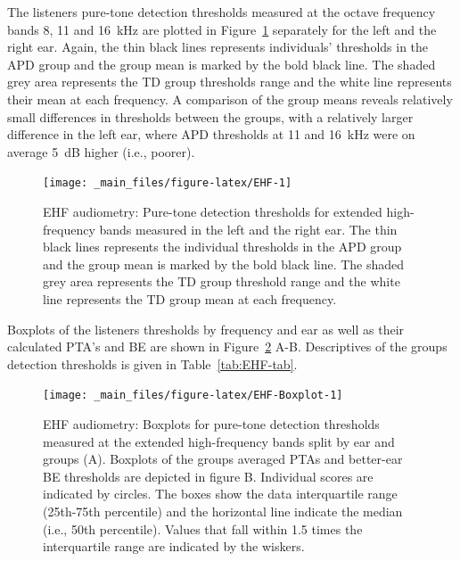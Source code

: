 \documentclass[a4paper, twoside]{templates/ociamthesis}
\begin{document}
The listeners pure-tone detection thresholds measured at the octave frequency bands 8, 11 and 16~kHz are plotted in Figure~\ref{fig:EHF} separately for the left and the right ear. Again, the thin black lines represents individuals' thresholds in the APD group and the group mean is marked by the bold black line. The shaded grey area represents the TD group thresholds range and the white line represents their mean at each frequency. A comparison of the group means reveals relatively small differences in thresholds between the groups, with a relatively larger difference in the left ear, where APD thresholds at 11 and 16~kHz were on average 5~dB higher (i.e., poorer).\\

\begin{figure}

{\centering \texttt{[image: \_main\_files/figure-latex/EHF-1]} 

}

\caption{EHF audiometry: Pure-tone detection thresholds for extended high-frequency bands measured in the left and the right ear. The thin black lines represents the individual thresholds in the APD group and the group mean is marked by the bold black line. The shaded grey area represents the TD group threshold range and the white line represents the TD group mean at each frequency.}\label{fig:EHF}
\end{figure}

Boxplots of the listeners thresholds by frequency and ear as well as their calculated PTA's and BE are shown in Figure~\ref{fig:EHF-Boxplot} A-B. Descriptives of the groups detection thresholds is given in Table~\ref{tab:EHF-tab}.\\

\begin{figure}

{\centering \texttt{[image: \_main\_files/figure-latex/EHF-Boxplot-1]} 

}

\caption{EHF audiometry: Boxplots for pure-tone detection thresholds measured at the extended high-frequency bands split by ear and groups (A). Boxplots of the groups averaged PTAs and better-ear BE thresholds are depicted in figure B. Individual scores are indicated by circles. The boxes show the data interquartile range (25th-75th percentile) and the horizontal line indicate the median (i.e., 50th percentile). Values that fall within 1.5 times the interquartile range are indicated by the wiskers.}\label{fig:EHF-Boxplot}
\end{figure}
\end{document}
